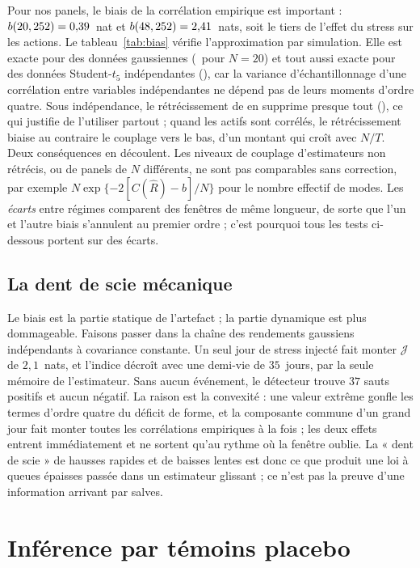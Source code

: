 \documentclass[12pt]{article}
\theoremstyle{definition}
\newcommand{\JJ}{\mathcal{J}}
\begin{document}
\begin{doublespace}
Pour nos panels, le biais de la corrélation empirique est important :
$b(20,252)=0{,}39$~nat et $b(48,252)=2{,}41$~nats,
soit le tiers de l'effet du stress sur les actions. Le
tableau~\ref{tab:bias} vérifie l'approximation par simulation. Elle est exacte
pour des données gaussiennes (\biasTwentyRaw\ pour $N=20$) et tout aussi
exacte pour des données Student-$t_5$ indépendantes (\biasTwentyT), car la
variance d'échantillonnage d'une corrélation entre variables indépendantes ne
dépend pas de leurs moments d'ordre quatre. Sous indépendance, le
rétrécissement de \citet{ledoit2004} en supprime presque tout
(\biasTwentyLW), ce qui justifie de l'utiliser partout ; quand les actifs sont
corrélés, le rétrécissement biaise au contraire le couplage vers le bas, d'un
montant qui croît avec $N/T$. Deux conséquences en découlent. Les niveaux de
couplage d'estimateurs non rétrécis, ou de panels de $N$ différents, ne sont
pas comparables sans correction, par exemple $N\exp\{-2[C(\hat R)-b]/N\}$ pour
le nombre effectif de modes. Les \emph{écarts} entre régimes comparent des
fenêtres de même longueur, de sorte que l'un et l'autre biais s'annulent au
premier ordre ; c'est pourquoi tous les tests ci-dessous portent sur des
écarts.

\subsection{La dent de scie mécanique}

Le biais est la partie statique de l'artefact ; la partie dynamique est plus
dommageable. Faisons passer dans la chaîne des rendements gaussiens
indépendants à covariance constante. Un seul jour de stress injecté fait
monter $\JJ$ de $2{,}1$~nats, et l'indice décroît avec une demi-vie de
$35$~jours, par la seule mémoire de l'estimateur. Sans aucun événement, le
détecteur trouve $37$ sauts positifs et aucun négatif. La raison est la
convexité : une valeur extrême gonfle les termes d'ordre quatre du déficit de
forme, et la composante commune d'un grand jour fait monter toutes les
corrélations empiriques à la fois ; les deux effets entrent immédiatement et
ne sortent qu'au rythme où la fenêtre oublie. La « dent de scie » de hausses
rapides et de baisses lentes est donc ce que produit une loi à queues épaisses
passée dans un estimateur glissant ; ce n'est pas la preuve d'une information
arrivant par salves.

\section{Inférence par témoins placebo}
\label{sec:inference}


\end{doublespace}
\end{document}
